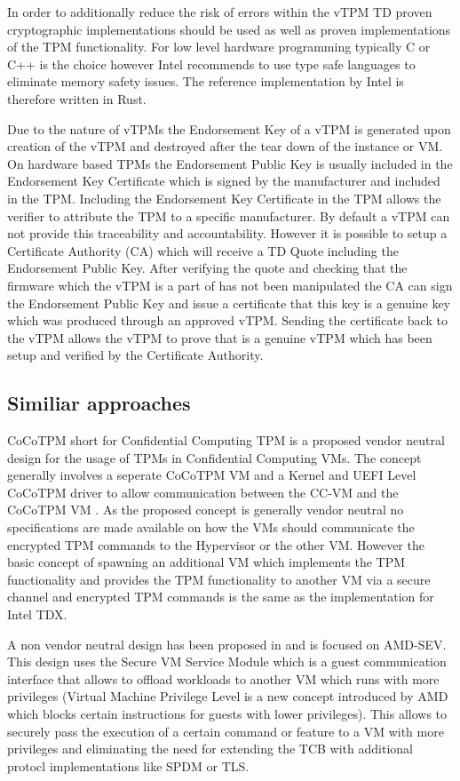 \documentclass[sigplan,screen,nonacm]{acmart}
\begin{document}
In order to additionally reduce the risk of errors within the vTPM TD proven cryptographic implementations should be used as well as proven implementations of the TPM functionality.
For low level hardware programming typically C or C++ is the choice however Intel recommends to use type safe languages to eliminate memory safety issues\cite[p. 20]{Intel-vTPM}.
The reference implementation by Intel is therefore written in Rust\cite[p. 20]{Intel-vTPM}.

Due to the nature of vTPMs the Endorsement Key of a vTPM is generated upon creation of the vTPM and destroyed after the tear down of the instance or VM.
On hardware based TPMs the Endorsement Public Key is usually included in the Endorsement Key Certificate which is signed by the manufacturer and included in the TPM.
Including the Endorsement Key Certificate in the TPM allows the verifier to attribute the TPM to a specific manufacturer.
By default a vTPM can not provide this traceability and accountability.
However it is possible to setup a Certificate Authority (CA) which will receive a TD Quote including the Endorsement Public Key.
After verifying the quote and checking that the firmware which the vTPM is a part of has not been manipulated the CA can sign the Endorsement Public Key and issue a certificate that this key is a genuine key which was produced through an approved vTPM.
Sending the certificate back to the vTPM allows the vTPM to prove that is a genuine vTPM which has been setup and verified by the Certificate Authority.

\subsection{Similiar approaches}
CoCoTPM short for Confidential Computing TPM is a proposed vendor neutral design for the usage of TPMs in Confidential Computing VMs.
The concept generally involves a seperate CoCoTPM VM and a Kernel and UEFI Level CoCoTPM driver to allow communication between the CC-VM and the CoCoTPM VM \cite[3]{10.1145/3564625.3564648}.
As the proposed concept is generally vendor neutral no specifications are made available on how the VMs should communicate the encrypted TPM commands to the Hypervisor or the other VM.
However the basic concept of spawning an additional VM which implements the TPM functionality and provides the TPM functionality to another VM via a secure channel and encrypted TPM commands is the same as the implementation for Intel TDX.

A non vendor neutral design has been proposed in \cite{10.1145/3627106.3627112} and is focused on AMD-SEV.
This design uses the Secure VM Service Module which is a guest communication interface that allows to offload workloads to another VM which runs with more privileges (Virtual Machine Privilege Level is a new concept introduced by AMD which blocks certain instructions for guests with lower privileges).
This allows to securely pass the execution of a certain command or feature to a VM with more privileges and eliminating the need for extending the TCB with additional protocl implementations like SPDM or TLS.
\end{document}
